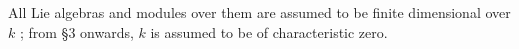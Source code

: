 
All Lie algebras and modules over them are assumed to be finite dimensional over \(k\) ; from §3 onwards, \(k\) is assumed to be of characteristic zero.

